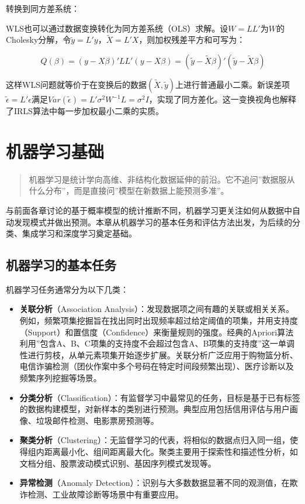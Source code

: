 \documentclass[
]{book}
\begin{document}
转换到同方差系统：

WLS也可以通过数据变换转化为同方差系统（OLS）求解。设\(W = L L'\)为\(W\)的Cholesky分解，令\(\tilde{y} = L' y\)，\(\tilde{X} = L' X\)，则加权残差平方和可写为：

\[Q(\beta) = (y - X\beta)' L L' (y - X\beta) = (\tilde{y} - \tilde{X}\beta)' (\tilde{y} - \tilde{X}\beta)\]

这样WLS问题就等价于在变换后的数据\((\tilde{X}, \tilde{y})\)上进行普通最小二乘。新误差项\(\tilde{\epsilon} = L' \epsilon\)满足\(Var(\tilde{\epsilon}) = L' \sigma^2 W^{-1} L = \sigma^2 I\)，实现了同方差化。这一变换视角也解释了IRLS算法中每一步加权最小二乘的实质。

\chapter{机器学习基础}\label{ux673aux5668ux5b66ux4e60ux57faux7840}

\begin{quote}
机器学习是统计学向高维、非结构化数据延伸的前沿。它不追问''数据服从什么分布''，而是直接问''模型在新数据上能预测多准''。
\end{quote}

与前面各章讨论的基于概率模型的统计推断不同，机器学习更关注如何从数据中自动发现模式并做出预测。本章从机器学习的基本任务和评估方法出发，为后续的分类、集成学习和深度学习奠定基础。

\section{机器学习的基本任务}\label{ux673aux5668ux5b66ux4e60ux7684ux57faux672cux4efbux52a1}

机器学习任务通常分为以下几类：

\begin{itemize}
\item
  \textbf{关联分析}（Association Analysis）：发现数据项之间有趣的关联或相关关系。例如，频繁项集挖掘旨在找出同时出现频率超过给定阈值的项集，并用支持度（Support）和置信度（Confidence）来衡量规则的强度。经典的Apriori算法利用''包含A、B、C项集的支持度不会超过包含A、B项集的支持度''这一单调性进行剪枝，从单元素项集开始逐步扩展。关联分析广泛应用于购物篮分析、电信诈骗检测（团伙作案中多个号码在特定时间段频繁出现）、医疗诊断以及频繁序列挖掘等场景。
\item
  \textbf{分类分析}（Classification）：有监督学习中最常见的任务，目标是基于已有标签的数据构建模型，对新样本的类别进行预测。典型应用包括信用评估与用户画像、垃圾邮件检测、电影票房预测等。
\item
  \textbf{聚类分析}（Clustering）：无监督学习的代表，将相似的数据点归入同一组，使得组内距离最小化、组间距离最大化。聚类主要用于探索性和描述性分析，如文档分组、股票波动模式识别、基因序列模式发现等。
\item
  \textbf{异常检测}（Anomaly Detection）：识别与大多数数据显著不同的观测值，在欺诈检测、工业故障诊断等场景中有重要应用。
\end{itemize}
\end{document}
